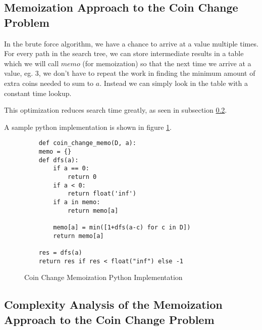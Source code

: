 \subsection{Memoization Approach to the Coin Change Problem}

In the brute force algorithm, we have a chance to arrive at a value multiple times. For every path in the search tree,
we can store intermediate results in a table which we will call $memo$ (for memoization) 
so that the next time we arrive at a value, eg. 3, we don't have to repeat the work in finding the minimum amount of extra coins needed to sum to $a$.
Instead we can simply look in the table with a constant time lookup.

This optimization reduces search time greatly, as seen in subsection \ref{subsec:ca-coin-change-memo}.

A sample python implementation is shown in figure \ref{fig:coin-change-memo}.

\begin{figure}[H]
    \centering
    \begin{lstlisting}
    def coin_change_memo(D, a):
    memo = {}
    def dfs(a):
        if a == 0:
            return 0
        if a < 0:
            return float('inf')
        if a in memo:
            return memo[a]
        
        memo[a] = min([1+dfs(a-c) for c in D])
        return memo[a]
            
    res = dfs(a)
    return res if res < float("inf") else -1
    \end{lstlisting}
    \caption{Coin Change Memoization Python Implementation}
    \label{fig:coin-change-memo}
\end{figure}

\subsection{Complexity Analysis of the Memoization Approach to the Coin Change Problem}\label{subsec:ca-coin-change-memo}

